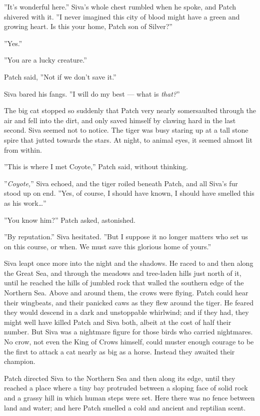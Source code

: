 \documentclass[12pt]{book}
\begin{document}
''It's wonderful here.'' Siva's whole chest rumbled when he spoke, and
Patch shivered with it. ''I never imagined this city of blood might
have a green and growing heart. Is this your home, Patch son of
Silver?''

''Yes.''

''You are a lucky creature.''

Patch said, ''Not if we don't save it.''

Siva bared his fangs. ''I will do my best --- what is \textit{that?}''

The big cat stopped so suddenly that Patch very nearly somersaulted
through the air and fell into the dirt, and only saved himself by
clawing hard in the last second. Siva seemed not to notice. The tiger
was busy staring up at a tall stone spire that jutted towards the
stars. At night, to animal eyes, it seemed almost lit from within.

''This is where I met Coyote,'' Patch said, without thinking.

''\textit{Coyote,}'' Siva echoed, and the tiger roiled beneath Patch,
and all Siva's fur stood up on end. ''Yes, of course, I should have
known, I should have smelled this as his work\ldots{}''

''You know him?'' Patch asked, astonished.

''By reputation.'' Siva hesitated. ''But I suppose it no longer
matters who set us on this course, or when. We must save this glorious
home of yours.''

Siva leapt once more into the night and the shadows. He raced to and
then along the Great Sea, and through the meadows and tree-laden hills
just north of it, until he reached the hills of jumbled rock that
walled the southern edge of the Northern Sea. Above and around them,
the crows were flying. Patch could hear their wingbeats, and their
panicked caws as they flew around the tiger. He feared they would
descend in a dark and unstoppable whirlwind; and if they had, they
might well have killed Patch and Siva both, albeit at the cost of half
their number. But Siva was a nightmare figure for those birds who
carried nightmares. No crow, not even the King of Crows himself, could
muster enough courage to be the first to attack a cat nearly as big as
a horse. Instead they awaited their champion.

Patch directed Siva to the Northern Sea and then along its edge, until
they reached a place where a tiny bay protruded between a sloping face
of solid rock and a grassy hill in which human steps were set. Here
there was no fence between land and water; and here Patch smelled a
cold and ancient and reptilian scent.
\end{document}
